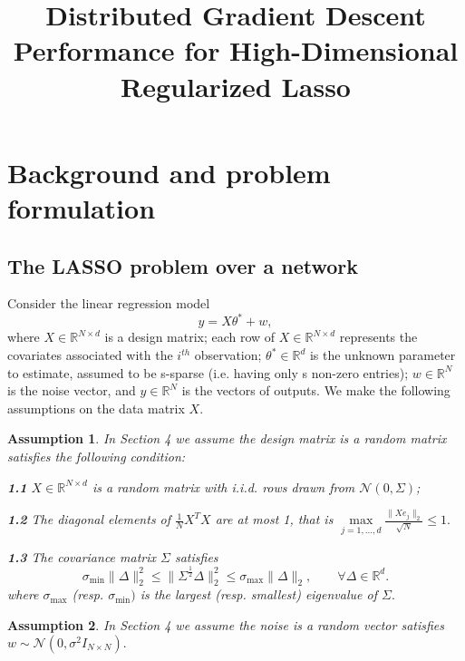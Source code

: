 \documentclass{article}
\title{Distributed Gradient Descent Performance for High-Dimensional Regularized Lasso}
\theoremstyle{break}
\newtheorem{assumption}{Assumption}
\begin{document}
\maketitle

\section{Background and problem formulation}
\subsection{The LASSO problem over a network}
\label{sec:headings} 
Consider the linear regression model
       \begin{equation}
           y=X\theta^{*}+w,
       \end{equation}
where $X\in \mathbb{R}^{N\times d}$ is a design matrix; each row of $X\in \mathbb{R}^{N\times d}$ represents the covariates associated with the $i^{th}$ observation; $\theta^*\in\mathbb{R}^d$ is the unknown parameter to estimate, assumed to be s-sparse (i.e. having only s non-zero entries); $w\in \mathbb{R}^N$ is the noise vector, and $y\in \mathbb{R}^N$ is the vectors of outputs. We make the following assumptions on the data matrix $X$.

\begin{assumption}
In Section 4 we assume the design matrix is a random matrix satisfies the following condition:
\item \textbf{1.1}
  $X\in \mathbb{R}^{N\times d}$ is a random matrix with i.i.d. rows drawn from $\mathcal{N}(0,\Sigma)$;
\item \textbf{1.2}
  The diagonal elements of $\frac{1}{N}X^TX$ are at most 1, that is $\max\limits_{j=1,\dots,d}\frac{\lVert Xe_j\rVert_2}{\sqrt{N}}\leq 1.$ 
\item \textbf{1.3}
 The covariance matrix $\Sigma$ satisfies
\begin{equation}\label{re}
    \sigma_{\min}\lVert\Delta\rVert_2^2\leq \lVert\Sigma^{\frac{1}{2}}\Delta\rVert_2^2\leq \sigma_{\max}\lVert\Delta\rVert_2, \qquad \forall \Delta \in \mathbb{R}^d.
\end{equation}
where $\sigma_{\max}$ (resp. $\sigma_{\min})$ is the largest (resp. smallest) eigenvalue of $\Sigma.$ 
\end{assumption}

\begin{assumption}
In Section 4 we assume the noise is a random vector satisfies 
 $w\sim \mathcal{N}(0,\sigma^2I_{N\times N}).$
\end{assumption}
\end{document}
